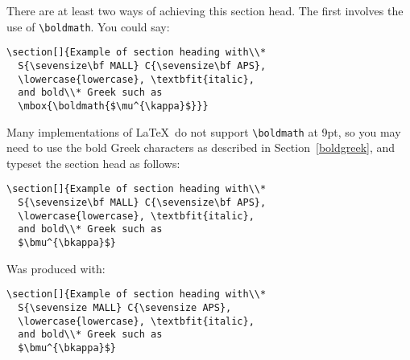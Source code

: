 \ifoldfss
%
There are at least two ways of achieving this section head. The first
involves the use of \verb"\boldmath". You could say:
%
\begin{verbatim}
\section[]{Example of section heading with\\*
  S{\sevensize\bf MALL} C{\sevensize\bf APS},
  \lowercase{lowercase}, \textbfit{italic},
  and bold\\* Greek such as
  \mbox{\boldmath{$\mu^{\kappa}$}}}
\end{verbatim}
%
Many implementations of \LaTeX\ do not support \verb"\boldmath" at 9pt,
so you may need to use the bold Greek characters as described in
Section~\ref{boldgreek}, and typeset the section head as follows:
%
\begin{verbatim}
\section[]{Example of section heading with\\*
  S{\sevensize\bf MALL} C{\sevensize\bf APS},
  \lowercase{lowercase}, \textbfit{italic},
  and bold\\* Greek such as
  $\bmu^{\bkappa}$}
\end{verbatim}
%
\else %
%
Was produced with:
%
\begin{verbatim}
\section[]{Example of section heading with\\*
  S{\sevensize MALL} C{\sevensize APS},
  \lowercase{lowercase}, \textbfit{italic},
  and bold\\* Greek such as
  $\bmu^{\bkappa}$}
\end{verbatim}
%
\fi

